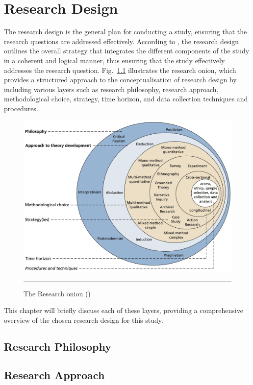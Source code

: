 \chapter{Research Design}\label{chap:research-design}

The research design is the general plan for conducting a study, ensuring that the research questions are addressed effectively.
According to \textcite{SaundersMark2023}, the research design outlines the overall strategy that integrates the different components of the study in a coherent and logical manner, thus ensuring that the study effectively addresses the research question.
Fig.~\ref{fig:research-onion} illustrates the research onion, which provides a structured approach to the conceptualisation of research design by including various layers such as research philosophy, research approach, methodological choice, strategy, time horizon, and data collection techniques and procedures.

\begin{figure}[htbp]
    \centering
 \includegraphics[width=.8\textwidth]{figures/research-design/research-onion.png}
     \rule{35em}{0.5pt}
    \caption{The Research onion (\textcite{SaundersMark2023})} 
 \label{fig:research-onion}
\end{figure}

This chapter will briefly discuss each of these layers, providing a comprehensive overview of the chosen research design for this study.

\section{Research Philosophy}\label{sec:research-philosophy}

%
\section{Research Approach}\label{sec:research-approach}

%
